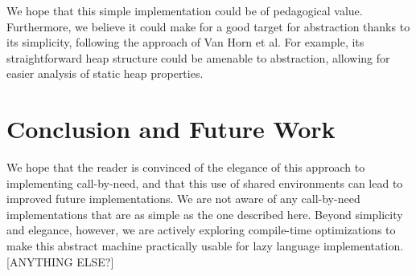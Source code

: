 \documentclass[preprint]{sigplanconf}
\begin{document}
We hope that this simple implementation could be of pedagogical value.
Furthermore, we believe it could make for a good target for abstraction thanks
to its simplicity, following the approach of Van Horn et
al\cite{van2010abstracting}. For example, its straightforward heap structure
could be amenable to abstraction, allowing for easier analysis of static heap
properties.

\section{Conclusion and Future Work}
We hope that the reader is convinced of the elegance of this approach to implementing
call-by-need, and that this use of shared environments can lead to
improved future implementations. We are not aware of any call-by-need
implementations that are as simple as the one described here.
Beyond simplicity and elegance, however, we are actively exploring compile-time
optimizations to make this abstract machine practically usable for lazy language
implementation. [ANYTHING ELSE?]



\end{document}
